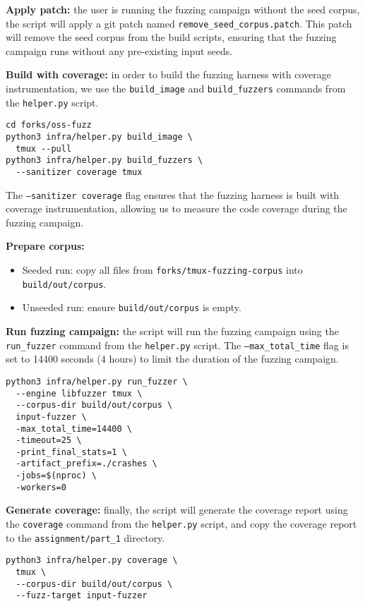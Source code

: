\documentclass[11pt,a4paper,twocolumn]{article}
\begin{document}
\textbf{Apply patch:} the user is running the fuzzing campaign without the seed corpus, the script will apply a git patch named \texttt{remove\_seed\_corpus.patch}. This patch will remove the seed corpus from the build scripts, ensuring that the fuzzing campaign runs without any pre-existing input seeds.

\textbf{Build with coverage:} in order to build the fuzzing harness with coverage instrumentation, we use the \texttt{build\_image} and \texttt{build\_fuzzers} commands from the \texttt{helper.py} script.

\begin{verbatim}
cd forks/oss-fuzz
python3 infra/helper.py build_image \
  tmux --pull
python3 infra/helper.py build_fuzzers \
  --sanitizer coverage tmux
\end{verbatim}

The \texttt{--sanitizer coverage} flag ensures that the fuzzing harness is built with coverage instrumentation, allowing us to measure the code coverage during the fuzzing campaign.

\textbf{Prepare corpus:}

\begin{itemize}
	\item Seeded run: copy all files from \texttt{forks/tmux-fuzzing-corpus} into \texttt{build/out/corpus}.
	\item Unseeded run: ensure \texttt{build/out/corpus} is empty.
\end{itemize}

\textbf{Run fuzzing campaign:} the script will run the fuzzing campaign using the \texttt{run\_fuzzer} command from the \texttt{helper.py} script. The \texttt{---max\_total\_time} flag is set to 14400 seconds (4 hours) to limit the duration of the fuzzing campaign.

\begin{verbatim}
python3 infra/helper.py run_fuzzer \
  --engine libfuzzer tmux \
  --corpus-dir build/out/corpus \
  input-fuzzer \
  -max_total_time=14400 \
  -timeout=25 \
  -print_final_stats=1 \
  -artifact_prefix=./crashes \
  -jobs=$(nproc) \
  -workers=0
\end{verbatim}

\textbf{Generate coverage:} finally, the script will generate the coverage report using the \texttt{coverage} command from the \texttt{helper.py} script, and copy the coverage report to the \texttt{assignment/part\_1} directory.

\begin{verbatim}
python3 infra/helper.py coverage \
  tmux \
  --corpus-dir build/out/corpus \
  --fuzz-target input-fuzzer
\end{verbatim}
\end{document}
